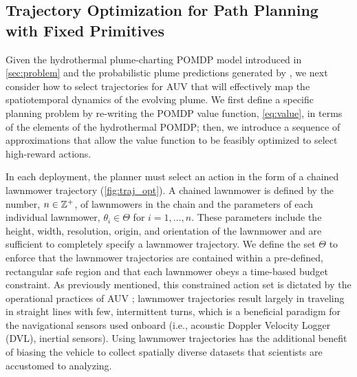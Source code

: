 \subsection{Trajectory Optimization for Path Planning with Fixed Primitives}
\label{sec:to}
Given the hydrothermal plume-charting POMDP model introduced in \cref{sec:problem} and the probabilistic plume predictions generated by \PHUMES, we next consider how to select trajectories for AUV \Sentry that will effectively map the spatiotemporal dynamics of the evolving plume.  We first define a specific planning problem by re-writing the POMDP value function, \cref{eq:value}, in terms of the elements of the hydrothermal POMDP; then, we introduce a sequence of approximations that allow the value function to be feasibly optimized to select high-reward actions.

In each deployment, the planner must select an action in the form of a chained lawnmower trajectory (\cref{fig:traj_opt}). A chained lawnmower is defined by the number, $n \in \mathbb{Z}^+$, of lawnmowers in the chain and the parameters of each individual lawnmower, $\theta_i \in \Theta$ for $i = 1, \dots, n$. These parameters include the height, width, resolution, origin, and orientation of the lawnmower and are sufficient to completely specify a lawnmower trajectory. We define the set $\Theta$ to enforce that the lawnmower trajectories are contained within a pre-defined, rectangular safe region and that each lawnmower obeys a time-based budget constraint. As previously mentioned, this constrained action set is dictated by the operational practices of AUV \Sentry; lawnmower trajectories result largely in \Sentry traveling in straight lines with few, intermittent turns, which is a beneficial paradigm for the navigational sensors used onboard (i.e., acoustic Doppler Velocity Logger (DVL), inertial sensors). Using lawnmower trajectories has the additional benefit of biasing the vehicle to collect spatially diverse datasets that scientists are accustomed to analyzing. 

